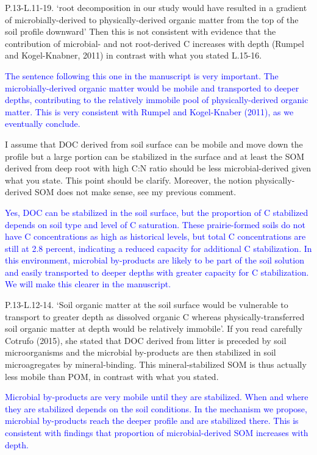 \documentclass[]{article}
\begin{document}
P.13-L.11-19. `root decomposition in our study would have resulted in a
gradient of microbially-derived to physically-derived organic matter
from the top of the soil profile downward' Then this is not consistent
with evidence that the contribution of microbial- and not root-derived C
increases with depth (Rumpel and Kogel-Knabner, 2011) in contrast with
what you stated L.15-16.

\textcolor{blue}{The sentence following this one in the manuscript is very important. The microbially-derived organic matter would be mobile and transported to deeper depths, contributing to the relatively immobile pool of physically-derived organic matter. This is very consistent with Rumpel and Kogel-Knaber (2011), as we eventually conclude.}

I assume that DOC derived from soil surface can be mobile and move down
the profile but a large portion can be stabilized in the surface and at
least the SOM derived from deep root with high C:N ratio should be less
microbial-derived given what you state. This point should be clarify.
Moreover, the notion physically-derived SOM does not make sense, see my
previous comment.

\textcolor{blue}{Yes, DOC can be stabilized in the soil surface, but the proportion of C stabilized depends on soil type and level of C saturation. These prairie-formed soils do not have C concentrations as high as historical levels, but total C concentrations are still at 2.8 percent, indicating a reduced capacity for additional C stabilization. In this environment, microbial by-products are likely to be part of the soil solution and easily transported to deeper depths with greater capacity for C stabilization. We will make this clearer in the manuscript.}

P.13-L.12-14. `Soil organic matter at the soil surface would be
vulnerable to transport to greater depth as dissolved organic C whereas
physically-transferred soil organic matter at depth would be relatively
immobile'. If you read carefully Cotrufo (2015), she stated that DOC
derived from litter is preceded by soil microorganisms and the microbial
by-products are then stabilized in soil microagregates by
mineral-binding. This mineral-stabilized SOM is thus actually less
mobile than POM, in contrast with what you stated.

\textcolor{blue}{Microbial by-products are very mobile until they are stabilized. When and where they are stabilized depends on the soil conditions. In the mechanism we propose, microbial by-products reach the deeper profile and are stabilized there. This is consistent with findings that proportion of microbial-derived SOM increases with depth.}
\end{document}
